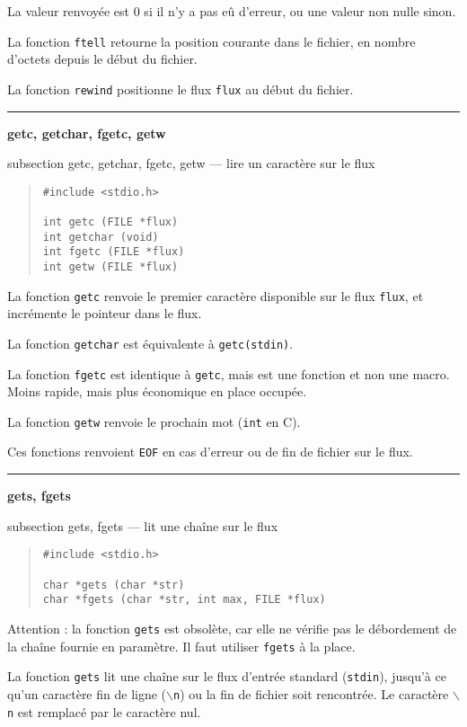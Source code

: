 \documentclass [twoside] {report}
\newcommand {\primitive} [1]
    {
	{\large \bf #1}
	\addcontentsline {toc} {subsection} {#1}
    }
\newcommand {\separation}
    {
	\vspace {7mm}
	\nopagebreak
	\hrule
    }
\begin{document}
La valeur renvoyée est 0 si il n'y a pas eû d'erreur, ou une valeur
non nulle sinon.

La fonction {\tt ftell} retourne la position courante dans le
fichier, en nombre d'octets depuis le début du fichier.

La fonction {\tt rewind} positionne le flux {\tt flux} au début
du fichier.


\separation
\primitive {getc, getchar, fgetc, getw} --- lire un caractère sur le flux

\begin {quote}
\begin {verbatim}
#include <stdio.h>

int getc (FILE *flux)
int getchar (void)
int fgetc (FILE *flux)
int getw (FILE *flux)
\end{verbatim}
\end {quote}

La fonction {\tt getc} renvoie le premier caractère
disponible sur le flux {\tt flux}, et incrémente le pointeur
dans le flux.

La fonction {\tt getchar} est équivalente à {\tt getc(stdin)}.

La fonction {\tt fgetc} est identique à {\tt getc}, mais est une
fonction et non une macro. Moins rapide, mais plus
économique en place occupée.

La fonction {\tt getw} renvoie le prochain mot ({\tt int} en C).

Ces fonctions renvoient {\tt EOF} en cas d'erreur ou de fin de
fichier sur le flux.



\separation
\primitive {gets, fgets} --- lit une chaîne sur le flux

\begin {quote}
\begin {verbatim}
#include <stdio.h>

char *gets (char *str)
char *fgets (char *str, int max, FILE *flux)
\end{verbatim}
\end {quote}

Attention : la fonction \texttt {gets} est obsolète, car elle ne
vérifie pas le débordement de la chaîne fournie en paramètre. Il
faut utiliser \texttt {fgets} à la place.

La fonction {\tt gets} lit une chaîne sur le flux d'entrée
standard ({\tt stdin}), jusqu'à ce qu'un caractère fin de ligne
({\tt $\backslash$n}) ou la fin de fichier soit rencontrée. Le caractère
{\tt $\backslash$n} est remplacé par le caractère nul.
\end{document}
